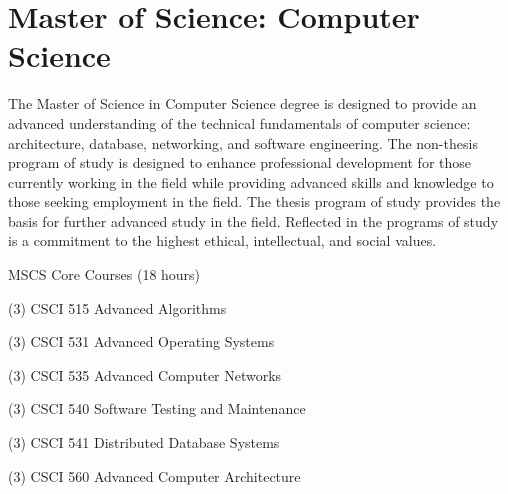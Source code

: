 %
\section*{Master of Science: Computer Science}

The Master of Science in Computer Science degree is designed to provide an advanced understanding of the technical fundamentals of computer science: architecture, database, networking, and software engineering. The non-thesis program of study is designed to enhance professional development for those currently working in the field while providing advanced skills and knowledge to those seeking employment in the field. The thesis program of study provides the basis for further advanced study in the field. Reflected in the programs of study is a commitment to the highest ethical, intellectual, and social values.

\begin{reqgroup}{MSCS Core Courses (18 hours)}
\begin{checklist}
\begin{minipage}[t]{0.5\linewidth}
	\item (3) CSCI 515  Advanced Algorithms
	\item (3) CSCI 531  Advanced Operating Systems
	\item (3) CSCI 535  Advanced Computer Networks
\end{minipage}
\begin{minipage}[t]{0.5\linewidth}
	\item (3) CSCI 540  Software Testing and Maintenance
	\item (3) CSCI 541  Distributed Database Systems
	\item (3) CSCI 560  Advanced Computer Architecture
\end{minipage}
\end{checklist}
\end{reqgroup}


